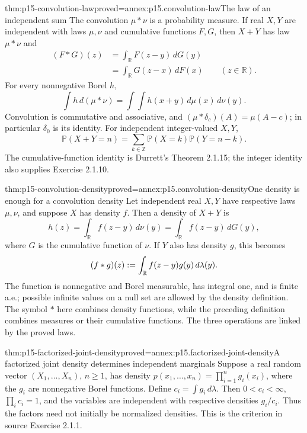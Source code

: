 \begin{hbtheorem}{thm:p15-convolution-law}{proved=annex:p15.convolution-law}{The law of an independent sum}
The convolution \(\mu*\nu\) is a probability measure. If real
\(X,Y\) are independent with laws \(\mu,\nu\) and cumulative
functions \(F,G\), then \(X+Y\) has law \(\mu*\nu\) and
\[
 \begin{aligned}
 (F*G)(z)&=\int_{\mathbb R}F(z-y)\,dG(y)\\
         &=\int_{\mathbb R}G(z-x)\,dF(x)
                     \qquad(z\in\mathbb R).
 \end{aligned}
\]
For every nonnegative Borel \(h\),
\[
 \int h\,d(\mu*\nu)
           =\int\!\int h(x+y)\,d\mu(x)\,d\nu(y).
\]
Convolution is commutative and associative, and
\((\mu*\delta_c)(A)=\mu(A-c)\); in particular \(\delta_0\)
is its identity. For independent integer-valued \(X,Y\),
\[
 \mathbb P(X+Y=n)
      =\sum_{k\in\mathbb Z}\mathbb P(X=k)\mathbb P(Y=n-k).
\]
The cumulative-function identity is Durrett's Theorem 2.1.15; the
integer identity also supplies Exercise 2.1.10.
\end{hbtheorem}

\begin{hbtheorem}{thm:p15-convolution-density}{proved=annex:p15.convolution-density}{One density is enough for a convolution density}
Let independent real \(X,Y\) have respective laws \(\mu,\nu\),
and suppose \(X\) has density \(f\). Then a density of \(X+Y\) is
\[
 h(z)=\int_{\mathbb R}f(z-y)\,d\nu(y)
     =\int_{\mathbb R}f(z-y)\,dG(y),
\]
where \(G\) is the cumulative function of \(\nu\).
If \(Y\) also has density \(g\), this becomes
\[
 (f*g)(z)\mathrel{:=}\int_{\mathbb R}f(z-y)g(y)\,d\lambda(y).
\]
The function is nonnegative and Borel measurable, has integral one,
and is finite a.e.; possible infinite values on a null set are allowed
by the density definition. The symbol \(*\) here combines density
functions, while the preceding definition combines measures or their
cumulative functions. The three operations are linked by the proved laws.
\end{hbtheorem}

\begin{hbtheorem}{thm:p15-factorized-joint-density}{proved=annex:p15.factorized-joint-density}{A factorized joint density determines independent marginals}
Suppose a real random vector \((X_1,\ldots,X_n)\), \(n\geq1\),
has density
\(p(x_1,\ldots,x_n)=\prod_{i=1}^n g_i(x_i)\), where the
\(g_i\) are nonnegative Borel functions. Define
\(c_i=\int g_i\,d\lambda\). Then \(0<c_i<\infty\),
\(\prod_i c_i=1\), and the variables are independent with respective
densities \(g_i/c_i\). Thus the factors need not initially be
normalized densities. This is the criterion in source Exercise 2.1.1.
\end{hbtheorem}

